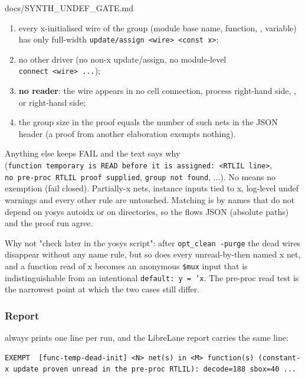 \begin{relocated}{docs/SYNTH_UNDEF_GATE.md}
\begin{enumerate}
\def\labelenumi{\arabic{enumi}.}
\tightlist
\item
  every x-initialised wire of the group (module base name, function,
  , variable) has only full-width
  \texttt{update/\allowbreak{}assign\ <wire>\ <const\ x>};
\item
  no other driver (no non-x update/\allowbreak{}assign, no module-level
  \texttt{connect\ <wire>\ .\allowbreak{}.\allowbreak{}.\allowbreak{}});
\item
  \textbf{no reader}: the wire appears in no cell connection, process
  right-hand side, ,  or 
  right-hand side;
\item
  the group size in the proof equals the number of such nets in the JSON
  header (a proof from another elaboration exempts nothing).
\end{enumerate}

Anything else keeps  FAIL and the text says why
(\texttt{function\ temporary\ is\ READ\ before\ it\ is\ assigned:\allowbreak{}\ <RTLIL\ line>},
\texttt{no\ pre-\allowbreak{}proc\ RTLIL\ proof\ supplied},
\texttt{group\ not\ found}, ...). No  means no
exemption (fail closed). Partially-x nets, instance inputs tied to x,
log-level undef warnings and every other rule are untouched. Matching is
by names that do not depend on yosys\textquotesingle{} autoidx or on
directories, so the flow\textquotesingle s JSON (absolute paths) and the
proof run agree.

Why not "check later in the yosys script": after
\texttt{opt\_\allowbreak{}clean\ -\allowbreak{}purge} the dead wires
disappear without any name rule, but so does every unread-by-then named
x net, and a function read of x becomes an anonymous \texttt{\$mux}
input that is indistinguishable from an intentional
\texttt{default:\allowbreak{}\ y\ =\allowbreak{}\ 'x}. The pre-proc read
test is the narrowest point at which the two cases still differ.

\subsubsection{Report}\label{tm:flow:synth-undef-gate:report}

 always prints one line per run, and the
LibreLane report  carries the same line:

\begin{lstlisting}[language={}]
EXEMPT  [func-temp-dead-init] <N> net(s) in <M> function(s) (constant-x update proven unread in the pre-proc RTLIL): decode=188 sbox=40 ...
\end{lstlisting}


\end{relocated}
